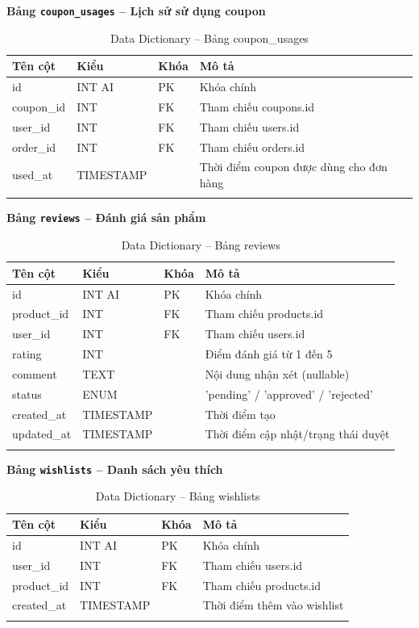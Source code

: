 \documentclass[a4paper]{article}
\begin{document}
\textbf{Bảng \texttt{coupon\_usages} -- Lịch sử sử dụng coupon}

\begin{longtable}{|p{3.5cm}|p{2.5cm}|p{1.5cm}|p{5cm}|}
\hline
\textbf{Tên cột} & \textbf{Kiểu} & \textbf{Khóa} & \textbf{Mô tả} \\
\hline
\endhead
id & INT AI & PK & Khóa chính \\
\hline
coupon\_id & INT & FK & Tham chiếu coupons.id \\
\hline
user\_id & INT & FK & Tham chiếu users.id \\
\hline
order\_id & INT & FK & Tham chiếu orders.id \\
\hline
used\_at & TIMESTAMP & & Thời điểm coupon được dùng cho đơn hàng \\
\hline
\caption{Data Dictionary -- Bảng coupon\_usages}
\end{longtable}

\textbf{Bảng \texttt{reviews} -- Đánh giá sản phẩm}

\begin{longtable}{|p{3.5cm}|p{2.5cm}|p{1.5cm}|p{5cm}|}
\hline
\textbf{Tên cột} & \textbf{Kiểu} & \textbf{Khóa} & \textbf{Mô tả} \\
\hline
\endhead
id & INT AI & PK & Khóa chính \\
\hline
product\_id & INT & FK & Tham chiếu products.id \\
\hline
user\_id & INT & FK & Tham chiếu users.id \\
\hline
rating & INT & & Điểm đánh giá từ 1 đến 5 \\
\hline
comment & TEXT & & Nội dung nhận xét (nullable) \\
\hline
status & ENUM & & 'pending' / 'approved' / 'rejected' \\
\hline
created\_at & TIMESTAMP & & Thời điểm tạo \\
\hline
updated\_at & TIMESTAMP & & Thời điểm cập nhật/trạng thái duyệt \\
\hline
\caption{Data Dictionary -- Bảng reviews}
\end{longtable}

\textbf{Bảng \texttt{wishlists} -- Danh sách yêu thích}

\begin{longtable}{|p{3.5cm}|p{2.5cm}|p{1.5cm}|p{5cm}|}
\hline
\textbf{Tên cột} & \textbf{Kiểu} & \textbf{Khóa} & \textbf{Mô tả} \\
\hline
\endhead
id & INT AI & PK & Khóa chính \\
\hline
user\_id & INT & FK & Tham chiếu users.id \\
\hline
product\_id & INT & FK & Tham chiếu products.id \\
\hline
created\_at & TIMESTAMP & & Thời điểm thêm vào wishlist \\
\hline
\caption{Data Dictionary -- Bảng wishlists}
\end{longtable}
\end{document}
